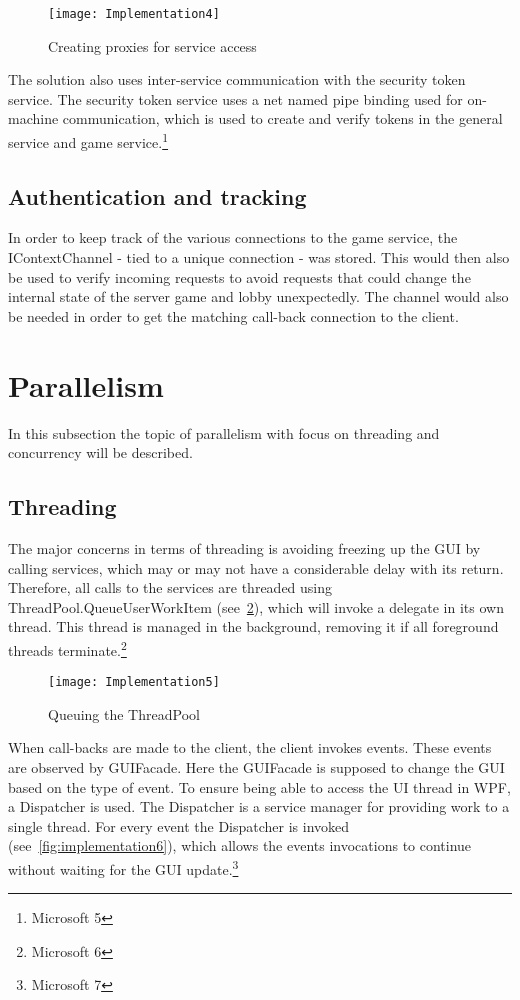 \begin{figure}[h]
\centerline{\texttt{[image: Implementation4]}}
\caption {Creating proxies for service access}
\label {fig:implementation4}
\end{figure}

The solution also uses inter-service communication with the security
 token service. The security token service uses a net named pipe binding
  used for on-machine communication, which is used to create and verify
  tokens in the general service and game service.\footnote{Microsoft 5}

\subsection {Authentication and tracking}
In order to keep track of the various connections to the game service,
 the IContextChannel - tied to a unique connection - was stored. This
 would then also be used to verify incoming requests to avoid requests
 that could change the internal state of the server game and lobby
  unexpectedly. The channel would also be needed in order to get the
   matching call-back connection to the client.

\section {Parallelism}
In this subsection the topic of parallelism with focus on threading and
concurrency will be described.

\subsection {Threading}
The major concerns in terms of threading is avoiding freezing up the GUI
by calling services, which may or may not have a considerable delay with
 its return. Therefore, all calls to the services are threaded using
 ThreadPool.QueueUserWorkItem (see~\ref{fig:implementation5}), which
 will invoke a delegate in its own thread. This thread is managed in
 the background, removing it if all foreground threads
  terminate.\footnote{Microsoft 6}

\begin{figure}[h]
\centerline{\texttt{[image: Implementation5]}}
\caption {Queuing the ThreadPool}
\label {fig:implementation5}
\end{figure}

When call-backs are made to the client, the client invokes events.
 These events are observed by GUIFacade. Here the GUIFacade is
  supposed to change the GUI based on the type of event. To ensure
   being able to access the UI thread in WPF, a Dispatcher is used.
    The Dispatcher is a service manager for providing work to a single
     thread. For every event the Dispatcher is invoked
     (see~\ref{fig:implementation6}), which allows the events invocations
      to continue without waiting for the GUI update.\footnote{Microsoft 7}

